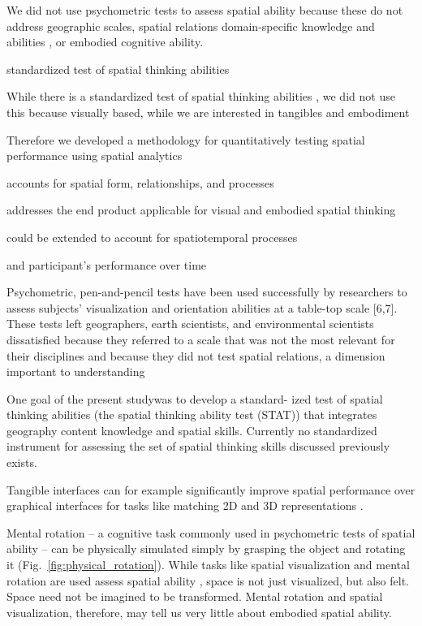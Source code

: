 

We did not use psychometric tests
to assess spatial ability because
these do not address 
geographic scales,
spatial relations
domain-specific knowledge and abilities 
\cite{Lee2009,Bednarz2011,Wakabayashi2011},
or embodied cognitive ability. 
%

standardized test of spatial thinking abilities

While there is a standardized test of spatial thinking abilities \cite{Bednarz2011,Lee2012},
we did not use this because
visually based, while
we are interested in tangibles and embodiment 

Therefore we developed a methodology
for quantitatively testing
spatial performance
using spatial analytics


accounts for 
spatial form, relationships, and processes

addresses the end product
applicable for visual and embodied spatial thinking

could be extended to account for 
spatiotemporal processes

and participant's performance over time


Psychometric, pen-and-pencil tests have been used successfully by researchers to assess subjects’
visualization and orientation abilities at a table-top scale [6,7]. These tests left geographers, earth scientists, and environmental scientists dissatisfied because they referred to a scale that was not the most relevant for their disciplines and because they did not test spatial relations, a dimension important to understanding

One goal of the present studywas to develop a standard-
ized test of spatial thinking abilities (the spatial thinking ability test (STAT)) that integrates geography content knowledge and spatial skills. Currently no standardized instrument for assessing the set of spatial thinking skills discussed previously exists. 

Tangible interfaces can
for example
significantly improve 
spatial performance over graphical interfaces 
for tasks like matching 2D and 3D representations \cite{Cuendet2012}.








Mental rotation 
-- a cognitive task commonly used in psychometric tests of spatial ability -- 
can be physically simulated 
simply by grasping the object and rotating it (Fig.~\ref{fig:physical_rotation}).
%
While tasks like spatial visualization and mental rotation are used assess spatial ability
\cite{Uttal2013a,Uttal2013,Ormand2014}, 
space is not just visualized, but also felt.
Space need not be imagined to be transformed. 
Mental rotation and spatial visualization, therefore, 
may tell us very little about embodied spatial ability. 







